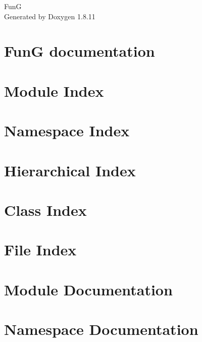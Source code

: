 \documentclass[twoside]{book}
\newcommand{\+}{\discretionary{\mbox{\scriptsize$\hookleftarrow$}}{}{}}
\newcommand{\clearemptydoublepage}{%
  \newpage{\pagestyle{empty}\cleardoublepage}%
}
\begin{document}
\hypersetup{pageanchor=false,
             bookmarksnumbered=true,
             pdfencoding=unicode
            }
\begin{titlepage}
\vspace*{7cm}
\begin{center}%
{\Large FunG }\\
\vspace*{1cm}
{\large Generated by Doxygen 1.8.11}\\
\end{center}
\end{titlepage}
\clearemptydoublepage
\tableofcontents
\clearemptydoublepage
{}
\hypersetup{pageanchor=true}

\chapter{FunG documentation}
\label{index}\hypertarget{index}{}
\chapter{Module Index}

\chapter{Namespace Index}

\chapter{Hierarchical Index}

\chapter{Class Index}

\chapter{File Index}

\chapter{Module Documentation}










\chapter{Namespace Documentation}












\end{document}
